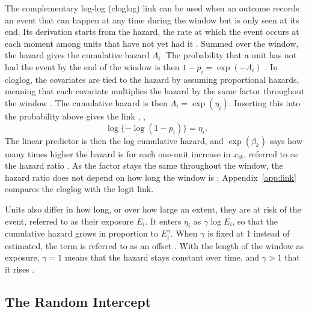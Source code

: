 The complementary log-log (cloglog) link can be used when an outcome records an event that can happen at any time during the window but is only seen at its end.
Its derivation starts from the hazard, the rate at which the event occurs at each moment among units that have not yet had it \cite[Section~10.2]{dobson2002glm}.
Summed over the window, the hazard gives the cumulative hazard $\Lambda_i$.
The probability that a unit has not had the event by the end of the window is then $1 - p_i = \exp(-\Lambda_i)$ \cite[Section~10.2, Eq.~10.4]{dobson2002glm}.
In cloglog, the covariates are tied to the hazard by assuming proportional hazards, meaning that each covariate multiplies the hazard by the same factor throughout the window \cite[Section~10.2.2]{dobson2002glm}.
The cumulative hazard is then $\Lambda_i = \exp(\eta_i)$.
Inserting this into the probability above gives the link \cite[Section~7.3]{dobson2002glm}, \cite[pp.~58--59, Eqs.~2--5]{prentice1978grouped},
\begin{equation}
  \log\{-\log(1 - p_i)\} = \eta_i .
  \label{eq:tech-cloglog}
\end{equation}
The linear predictor is then the log cumulative hazard, and $\exp(\beta_k)$ says how many times higher the hazard is for each one-unit increase in $x_{ik}$, referred to as the hazard ratio \cite[Section~10.2.2, Eqs.~10.7--10.9]{dobson2002glm}.
As the factor stays the same throughout the window, the hazard ratio does not depend on how long the window is \cite[p.~66]{prentice1978grouped}; Appendix~\ref{app:link} compares the cloglog with the logit link.

Units also differ in how long, or over how large an extent, they are at risk of the event, referred to as their exposure $E_i$.
It enters $\eta_i$ as $\gamma \log E_i$, so that the cumulative hazard grows in proportion to $E_i^{\gamma}$.
When $\gamma$ is fixed at 1 instead of estimated, the term is referred to as an offset \cite[Section~9.2, Eq.~9.3]{dobson2002glm}.
With the length of the window as exposure, $\gamma = 1$ means that the hazard stays constant over time, and $\gamma > 1$ that it rises \cite[Section~10.2.3, Eqs.~10.12--10.13]{dobson2002glm}.

\subsection{The Random Intercept}

